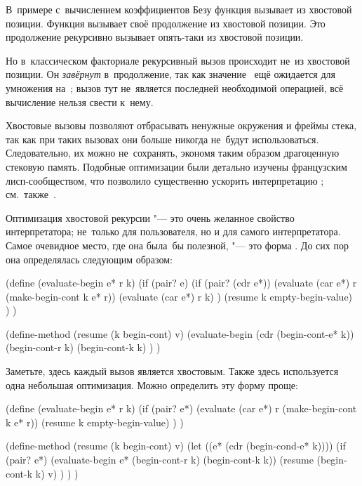 В~примере с~вычислением коэффициентов Безу функция  вызывает
 из хвостовой позиции. Функция  вызывает своё продолжение
из хвостовой позиции. Это продолжение рекурсивно вызывает  опять-таки
из хвостовой позиции.

Но в~классическом факториале  рекурсивный вызов
 происходит не~из хвостовой позиции. Он \emph{завёрнут} в~продолжение,
так как значение~ ещё ожидается для умножения на~;
вызов тут не~является последней необходимой операцией, всё вычисление нельзя
свести к~нему.

Хвостовые вызовы позволяют отбрасывать ненужные окружения и фреймы стека, так
как при таких вызовах они больше никогда не~будут использоваться. Следовательно,
их можно не~сохранять, экономя таким образом драгоценную стековую память.
Подобные оптимизации были детально изучены французским лисп-сообществом, что
позволило существенно ускорить интерпретацию \cite{gre77,cha80,sj87};
см.~также~\cite{han90}.

\bigskip

Оптимизация хвостовой рекурсии "--- это очень желанное свойство интерпретатора;
не~только для пользователя, но и для самого интерпретатора. Самое очевидное
место, где она была~бы полезной, "--- это форма . До сих пор она
определялась следующим образом:

\begin{code:lisp}
(define (evaluate-begin e* r k)
  (if (pair? e)
      (if (pair? (cdr e*))
          (evaluate (car e*) r (make-begin-cont k e* r))
          (evaluate (car e*) r k) )
      (resume k empty-begin-value) ) )

(define-method (resume (k begin-cont) v)
  (evaluate-begin (cdr (begin-cont-e* k))
                  (begin-cont-r k)
                  (begin-cont-k k) ) )
\end{code:lisp}

Заметьте, здесь каждый вызов является хвостовым. Также здесь используется одна
небольшая оптимизация. Можно определить эту форму проще:

\begin{code:lisp}
(define (evaluate-begin e* r k)
  (if (pair? e*)
      (evaluate (car e*) r (make-begin-cont k e* r))
      (resume k empty-begin-value) ) )

(define-method (resume (k begin-cont) v)
  (let ((e* (cdr (begin-cond-e* k))))
    (if (pair? e*)
        (evaluate-begin e* (begin-cont-r k) (begin-cont-k k))
        (resume (begin-cont-k k) v) ) ) )
\end{code:lisp}

